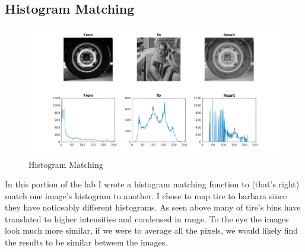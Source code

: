 \subsection{Histogram Matching}

\begin{figure}[H]
    \centering
    \includegraphics[scale=0.5]{match.png}
    \caption{Histogram Matching}
\end{figure}

In this portion of the lab I wrote a histogram matching function to (that's
right) match one image's histogram to another. I chose to map tire to barbara
since they have noticeably different histograms. As seen above many of tire's
bins have translated to higher intensities and condensed in range. To the eye
the images look much more similar, if we were to average all the pixels, we
would likely find the results to be similar between the images.
